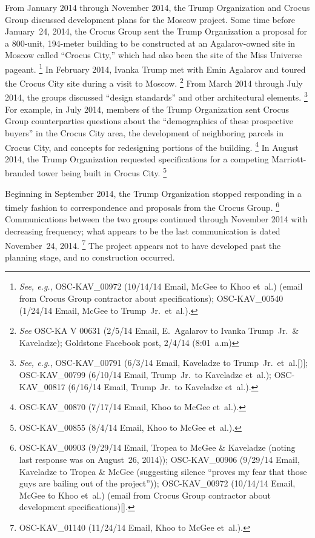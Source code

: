 From January 2014 through November 2014, the Trump Organization and Crocus Group discussed development plans for the Moscow project.
Some time before January~24, 2014, the Crocus Group sent the Trump Organization a proposal for a 800-unit, 194-meter building to be constructed at an Agalarov-owned site in Moscow called ``Crocus City,'' which had also been the site of the Miss Universe pageant.%
\footnote{\textit{See, e.g.}, OSC-KAV\_00972 (10/14/14 Email, McGee to Khoo et~al.) (email from Crocus Group contractor about specifications); OSC-KAV\_00540 (1/24/14 Email, McGee to Trump~Jr.\ et~al.).}
In February 2014, Ivanka Trump met with Emin Agalarov and toured the Crocus City site during a visit to Moscow.%
\footnote{\textit{See} OSC-KA V 00631 (2/5/14 Email, E.~Agalarov to Ivanka Trump~Jr.\ \& Kaveladze); Goldstone Facebook post, 2/4/14 (8:01~a.m) }
From March 2014 through July 2014, the groups discussed ``design standards'' and other architectural elements.%
\footnote{\textit{See, e.g.}, OSC-KAV\_00791 (6/3/14 Email, Kaveladze to Trump~Jr.\ et~al.[)]; OSC-KAV\_00799 (6/10/14 Email, Trump~Jr.\ to Kaveladze et~al.); OSC-KAV\_00817 (6/16/14 Email, Trump~Jr.\ to Kaveladze et~al.).}
For example, in July 2014, members of the Trump Organization sent Crocus Group counterparties questions about the ``demographics of these prospective buyers'' in the Crocus City area, the development of neighboring parcels in Crocus City, and concepts for redesigning portions of the building.%
\footnote{OSC-KAV\_00870 (7/17/14 Email, Khoo to McGee et~al.).}
In August 2014, the Trump Organization requested specifications for a competing Marriott-branded tower being built in Crocus City.%
\footnote{OSC-KAV\_00855 (8/4/14 Email, Khoo to McGee et~al.).}

Beginning in September 2014, the Trump Organization stopped responding in a timely fashion to correspondence and proposals from the Crocus Group.%
\footnote{OSC-KAV\_00903 (9/29/14 Email, Tropea to McGee \& Kaveladze (noting last response was on August~26, 2014)); OSC-KAV\_00906 (9/29/14 Email, Kaveladze to Tropea \& McGee (suggesting silence ``proves my fear that those guys are bailing out of the project'')); OSC-KAV\_00972 (10/14/14 Email, McGee to Khoo et~al.) (email from Crocus Group contractor about development specifications)[].}
Communications between the two groups continued through November 2014 with decreasing frequency; what appears to be the last communication is dated November~24, 2014.%
\footnote{OSC-KAV\_01140 (11/24/14 Email, Khoo to McGee et~al.).}
The project appears not to have developed past the planning stage, and no construction occurred.

